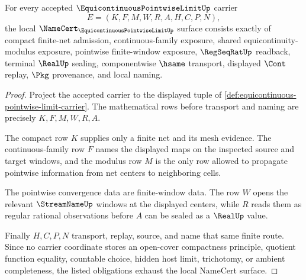 \begin{theorem}
\label{thm:equicontinuous-pointwise-limit-namecert-obligations}
For every accepted $\EquicontinuousPointwiseLimitUp$ carrier
$$
E=(K,F,M,W,R,A,H,C,P,N),
$$
the local $\NameCert_{\EquicontinuousPointwiseLimitUp}$ surface consists exactly of compact finite-net admission, continuous-family exposure, shared equicontinuity-modulus exposure, pointwise finite-window exposure, $\RegSeqRatUp$ readback, terminal $\RealUp$ sealing, componentwise $\hsame$ transport, displayed $\Cont$ replay, $\Pkg$ provenance, and local naming.
\end{theorem}
\begin{proof}
Project the accepted carrier to the displayed tuple of \autoref{def:equicontinuous-pointwise-limit-carrier}. The mathematical rows before transport and naming are precisely $K,F,M,W,R,A$.

The compact row $K$ supplies only a finite net and its mesh evidence. The continuous-family row $F$ names the displayed maps on the inspected source and target windows, and the modulus row $M$ is the only row allowed to propagate pointwise information from net centers to neighboring cells.

The pointwise convergence data are finite-window data. The row $W$ opens the relevant $\StreamNameUp$ windows at the displayed centers, while $R$ reads them as regular rational observations before $A$ can be sealed as a $\RealUp$ value.

Finally $H,C,P,N$ transport, replay, source, and name that same finite route. Since no carrier coordinate stores an open-cover compactness principle, quotient function equality, countable choice, hidden host limit, trichotomy, or ambient completeness, the listed obligations exhaust the local NameCert surface.
\end{proof}

